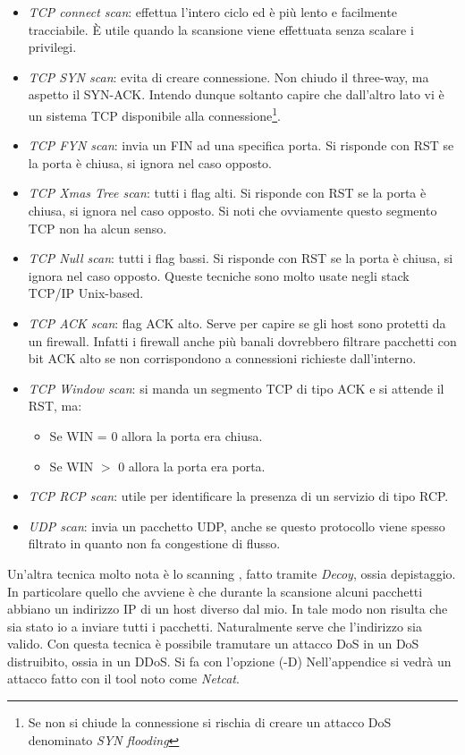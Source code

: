 \documentclass[14pt]{extreport}
\begin{document}
\begin{itemize}
    \item \textit{TCP connect scan}: effettua l'intero ciclo ed è più lento e facilmente tracciabile. È utile quando la scansione viene effettuata senza scalare i privilegi.
    \item \textit{TCP SYN scan}: evita di creare connessione. Non chiudo il three-way, ma aspetto il SYN-ACK. Intendo dunque soltanto capire che dall'altro lato vi è un sistema TCP disponibile alla connessione\footnote{Se non si chiude la connessione si rischia di creare un attacco DoS denominato \textit{SYN flooding}}.
    \item \textit{TCP FYN scan}: invia un FIN ad una specifica porta. Si risponde con RST se la porta è chiusa, si ignora nel caso opposto.
    \item \textit{TCP Xmas Tree scan}: tutti i flag alti. Si risponde con RST se la porta è chiusa, si ignora nel caso opposto. Si noti che ovviamente questo segmento TCP non ha alcun senso.
    \item \textit{TCP Null scan}: tutti i flag bassi. Si risponde con RST se la porta è chiusa, si ignora nel caso opposto.
    Queste tecniche sono molto usate negli stack TCP/IP Unix-based.
    \item \textit{TCP ACK scan}: flag ACK alto. Serve per capire se gli host sono protetti da un firewall. Infatti i firewall anche più banali dovrebbero filtrare pacchetti con bit ACK alto se non corrispondono a connessioni richieste dall'interno.
    \item \textit{TCP Window scan}: si manda un segmento TCP di tipo ACK e si attende il RST, ma:
    
    \begin{itemize}
        \item Se WIN = 0 allora la porta era chiusa.
        \item Se WIN $>$ 0 allora la porta era porta.
    \end{itemize}
    \item \textit{TCP RCP scan}: utile per identificare la presenza di un servizio di tipo RCP.
    \item \textit{UDP scan}: invia un pacchetto UDP, anche se questo protocollo viene spesso filtrato in quanto non fa congestione di flusso.
\end{itemize}

Un'altra tecnica molto nota è lo scanning , fatto tramite \textit{Decoy}, ossia depistaggio. In particolare quello che avviene è che durante la scansione alcuni pacchetti abbiano un indirizzo IP di un host diverso dal mio. In tale modo non risulta che sia stato io a inviare tutti i pacchetti. Naturalmente serve che l'indirizzo sia valido. Con questa tecnica è possibile tramutare un attacco DoS in un DoS distruibito, ossia in un DDoS. Si fa con l'opzione (-D)
Nell'appendice si vedrà un attacco fatto con il tool noto come \textit{Netcat}.
\end{document}
